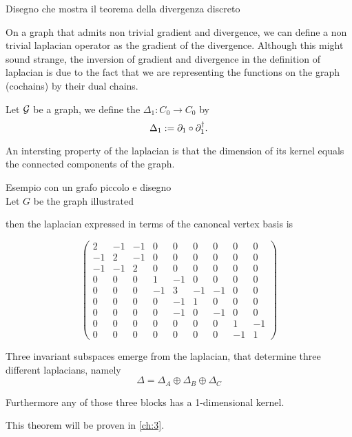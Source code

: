 \documentclass[../2.tex]{subfiles}
\begin{document}
    {\color{red} Disegno che mostra il teorema della divergenza discreto}

    On a graph that admits non trivial gradient and divergence, we can define a non trivial laplacian operator as the gradient of the divergence.
    Although this might sound strange, the inversion of gradient and divergence in the definition of laplacian is due to the fact that we are representing
    the functions on the graph (cochains) by their dual chains.

    \begin{defn}
        Let $\mathcal{G}$ be a graph, we define the  $\Delta_1 : C_0 \to C_0$ by 
        \[ \Delta_1 := \partial_1 \circ \partial^\dagger_1.\]
    \end{defn}

    An intersting property of the laplacian is that the dimension of its kernel equals the connected components of the graph.

    {\color{red} Esempio con un grafo piccolo e disegno \\

    Let $G$ be the graph illustrated 
    
    then the laplacian expressed in terms of the canoncal vertex basis is 

    \[\begin{pmatrix}
            2 & -1 & -1 & 0 & 0 & 0 & 0 & 0 & 0 \\
            -1 & 2 & -1 & 0 & 0 & 0 & 0 & 0 & 0 \\
            -1 & -1 & 2 & 0 & 0 & 0 & 0 & 0 & 0 \\
            0 & 0 & 0 & 1 & -1 & 0 & 0 & 0 & 0 \\
            0 & 0 & 0 & -1 & 3 & -1 & -1 & 0 & 0 \\
            0 & 0 & 0 & 0 & -1 & 1 & 0 & 0 & 0 \\
            0 & 0 & 0 & 0 & -1 & 0 & -1 & 0 & 0 \\
            0 & 0 & 0 & 0 & 0 & 0 & 0 & 1 & -1 \\
            0 & 0 & 0 & 0 & 0 & 0 & 0 & -1 & 1 
        \end{pmatrix} \] 

    Three invariant subspaces emerge from the laplacian, that determine three different laplacians, namely
    \[ \Delta = \Delta_A \oplus \Delta_B \oplus \Delta_C \]

    Furthermore any of those three blocks has a 1-dimensional kernel.
        
        
        }

    This theorem will be proven in \autoref{ch:3}.
\end{document}

